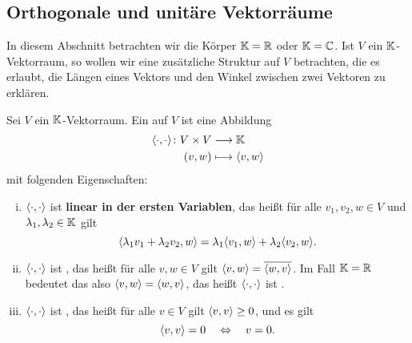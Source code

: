 \subsection{Orthogonale und unitäre Vektorräume}
\label{sec:2.3}

In diesem Abschnitt betrachten wir die Körper $\mathbb{K} = \mathbb{R}$ oder $\mathbb{K} = \mathbb{C}$.
Ist $V$ ein $\mathbb{K}$-Vektorraum, so wollen wir eine zusätzliche Struktur auf $V$ betrachten, die es erlaubt, die Längen eines Vektors und den Winkel zwischen zwei Vektoren zu erklären.

\begin{definition}[Skalarprodukt]
	\label{def:3.1}
	Sei $V$ ein $\mathbb{K}$-Vektorraum.
	Ein  auf $V$ ist eine Abbildung
	\begin{align*}
		\langle\cdot,\cdot\rangle \colon V \times V &\longrightarrow \mathbb{K} \\
		(v,w) &\longmapsto \langle v,w\rangle
	\end{align*}
	mit folgenden Eigenschaften:
	\begin{enumerate}[(i)]
		\item $\langle\cdot,\cdot\rangle$ ist \textbf{linear in der ersten Variablen}, das heißt für alle $v_1,v_2,w \in V$ und $\lambda_1,\lambda_2 \in \mathbb{K}$ gilt
		\[
			\sk{\lambda_1v_1+\lambda_2v_2,w} = \lambda_1 \sk{v_1,w} + \lambda_2 \sk{v_2,w}.
		\]
		\item $\langle\cdot,\cdot\rangle$ ist , das heißt für alle $v,w \in V$ gilt $\left\langle v,w\right\rangle = \overline{\left\langle w,v\right\rangle}$.
		Im Fall $\mathbb{K}=\mathbb{R}$ bedeutet das also $\left\langle v,w\right\rangle = \left\langle w,v\right\rangle$, das heißt $\langle\cdot,\cdot\rangle$ ist .
		\item  $\langle\cdot,\cdot\rangle$ ist , das heißt für alle $v \in V$ gilt $\left\langle v,v\right\rangle \geq 0$, und es gilt
		\[
			\left\langle v,v\right\rangle = 0 \quad \Leftrightarrow \quad v = 0.
		\]
	\end{enumerate}
\end{definition}

